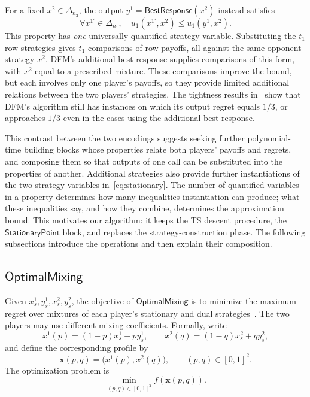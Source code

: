\documentclass[11pt]{article}
\theoremstyle{remark}
\theoremstyle{plain}
\newcommand{\om}{\mathsf{OptimalMixing}}
\newcommand{\spoint}{\mathsf{StationaryPoint}}
\newcommand{\br}{\mathsf{BestResponse}}
\begin{document}
For a fixed $x^2\in\Delta_{n_2}$, the output
$y^1=\br(x^2)$ instead satisfies
\[
 \forall x^{1\prime}\in\Delta_{n_1},\quad
 u_1(x^{1\prime},x^2)\le u_1(y^1,x^2).
\]
This property has \emph{one} universally quantified strategy variable.
Substituting the $t_1$ row strategies gives $t_1$ comparisons of row
payoffs, all against the same opponent strategy $x^2$. DFM's additional
best response supplies comparisons of this form, with $x^2$ equal to a
prescribed mixture. These comparisons improve the bound, but each
involves only one player's payoffs, so they provide limited
additional relations between the two players' strategies. The
tightness results in~\cite{tightness2023} show that DFM's algorithm
still has instances on which its output regret equals $1/3$, or
approaches $1/3$ even in the cases using the additional best response.

This contrast between the two encodings suggests seeking further polynomial-time building
blocks whose properties relate both players' payoffs and regrets, and
composing them so that outputs of one call can be substituted into the
properties of another. Additional strategies also provide further
instantiations of the two strategy variables in~\eqref{eq:stationary}.
The number of quantified variables in a property determines how many
inequalities instantiation can produce; what these inequalities say,
and how they combine, determines the approximation bound. This
motivates our algorithm: it keeps the TS descent procedure, the
$\spoint$ block, and replaces the strategy-construction phase.
The following subsections introduce the operations and then explain
their composition.

\subsection{\texorpdfstring{$\om$}{OptimalMixing}}
\label{sec:optimalmixing}

Given $x_s^1,y_s^1,x_s^2,y_s^2$, the objective of $\om$ is to minimize
the maximum regret over mixtures of each player's stationary and dual
strategies~\cite{mixing2025,legone2026}. The two players may use
different mixing coefficients. Formally, write
\[
 x^1(p)=(1-p)x_s^1+p y_s^1,\qquad
 x^2(q)=(1-q)x_s^2+q y_s^2,
\]
and define the corresponding profile by
\[
 \boldsymbol{x}(p,q)
 =\bigl(x^1(p),x^2(q)\bigr),
 \qquad (p,q)\in[0,1]^2.
\]
The optimization problem is
\[
 \min_{(p,q)\in[0,1]^2}f(\boldsymbol{x}(p,q)).
\]
\end{document}
